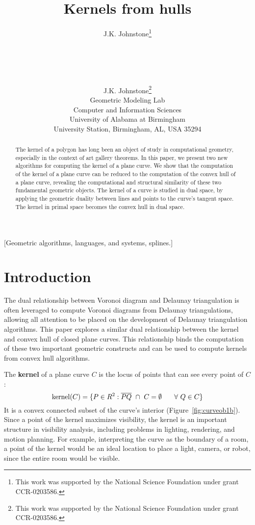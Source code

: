 \documentclass{sig-alternate}
\title{Kernels from hulls}
\author{
\alignauthor J.K. Johnstone\thanks{This work was supported by the National Science Foundation under grant CCR-0203586.}\\
\affaddr{Geometric Modeling Lab}\\
\affaddr{Computer and Information Sciences}\\
\affaddr{University of Alabama at Birmingham}\\
\affaddr{University Station, Birmingham, AL, USA 35294}\\
\email{jj@cis.uab.edu}
}
\author{J.K. Johnstone\thanks{This work was supported by the National Science Foundation under grant CCR-0203586.}\\
Geometric Modeling Lab\\
Computer and Information Sciences\\
University of Alabama at Birmingham\\
University Station, Birmingham, AL, USA 35294}
\newcommand{\seg}[1]{\mbox{$\overline{#1}$}}
\begin{document}
\ifACM
{}
\fi
\maketitle

\begin{abstract}
The kernel of a polygon has long been an object of study in computational
geometry, especially in the context of art gallery theorems.
In this paper, we present two new algorithms for computing the kernel of a
plane curve.
We show that the computation of the kernel of a plane curve
can be reduced to the computation of the convex hull of a plane curve,
revealing the computational and structural similarity of these two fundamental
geometric objects.
The kernel of a curve is studied in dual space, by applying the 
geometric duality between lines and points to the curve's tangent space.
The kernel in primal space becomes the convex hull in dual space.
\end{abstract}

\ifACM
{}[Geometric algorithms, languages, and systems, splines.]
\fi


\section{Introduction}

The dual relationship between Voronoi diagram and Delaunay triangulation
\cite{preparata85} is often leveraged to compute Voro\-noi diagrams from 
Delaunay triangulations,
allowing all attention to be placed on the development of Delaunay triangulation
algorithms.
This paper explores a similar dual relationship between the kernel and convex hull
of closed plane curves.
This relationship binds the computation of these two important geometric constructs
and can be used to compute kernels from convex hull algorithms. 

The {\bf kernel} of a plane curve $C$ is the locus of points that can see every
point of $C$:
\[
\mbox{kernel}(C) = \{ P \in R^2: \seg{PQ} \ \cap \ C = \emptyset 
		\hspace{.25in} \forall \ Q \in C \}
\]
It is a convex connected subset of the curve's interior (Figure~\ref{fig:curveob1b}).
Since a point of the kernel maximizes visibility, the kernel 
is an important structure in visibility analysis,
including problems in lighting, rendering, and motion planning.
For example, interpreting the curve as the boundary of a room,
a point of the kernel would be an ideal location to place a light, camera, or robot,
since the entire room would be visible.
\end{document}
